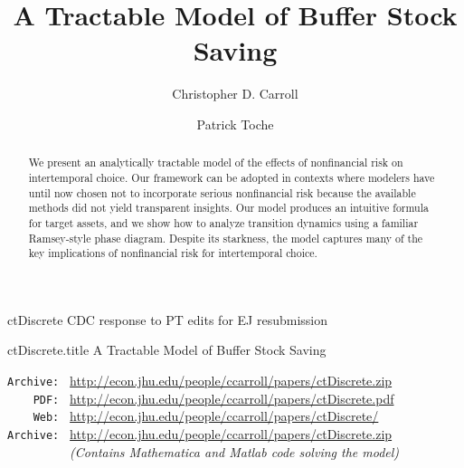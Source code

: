 \documentclass[titlepage,abstract]{\econtex}\newcommand{\texname}{ctDiscrete}
\begin{document}


\hfill{\tiny \texname}%
\hfill{\tiny CDC response to PT edits for EJ resubmission}%

\title{A Tractable Model of Buffer Stock Saving}%

\begin{verbatimwrite}{\texname.title}
A Tractable Model of Buffer Stock Saving
\end{verbatimwrite}

\author{Christopher D. Carroll\authNum \and Patrick Toche\authNum}%

%

%

\maketitle%


\begin{abstract}%
  We present an analytically tractable model of the effects of
  nonfinancial risk on intertemporal choice. Our framework can be
  adopted in contexts where modelers have until now chosen not to
  incorporate serious nonfinancial risk because the available methods
  did not yield transparent insights.  Our model produces an
  intuitive formula for target assets, and we show how to analyze
  transition dynamics using a familiar Ramsey-style phase diagram.
  Despite its starkness, the model captures many of the key
  implications of nonfinancial risk for intertemporal choice.
\end{abstract}%


\vspace{0.15in}

\begin{small}
\parbox{\textwidth}{
\begin{center}
\begin{tabbing} 
\texttt{Archive:~} \= \= \url{http://econ.jhu.edu/people/ccarroll/papers/ctDiscrete.zip} \kill \\  
\texttt{~~~~PDF:~} \> \> \url{http://econ.jhu.edu/people/ccarroll/papers/ctDiscrete.pdf} \\
\texttt{~~~~Web:~} \> \> \url{http://econ.jhu.edu/people/ccarroll/papers/ctDiscrete/}    \\ 
\texttt{Archive:~} \> \> \url{http://econ.jhu.edu/people/ccarroll/papers/ctDiscrete.zip} \\
\texttt{~~~~~~~~~} \> \> {\it (Contains Mathematica and Matlab code solving the model)}
\end{tabbing}
\end{center}
}
\end{small}
\end{document}
